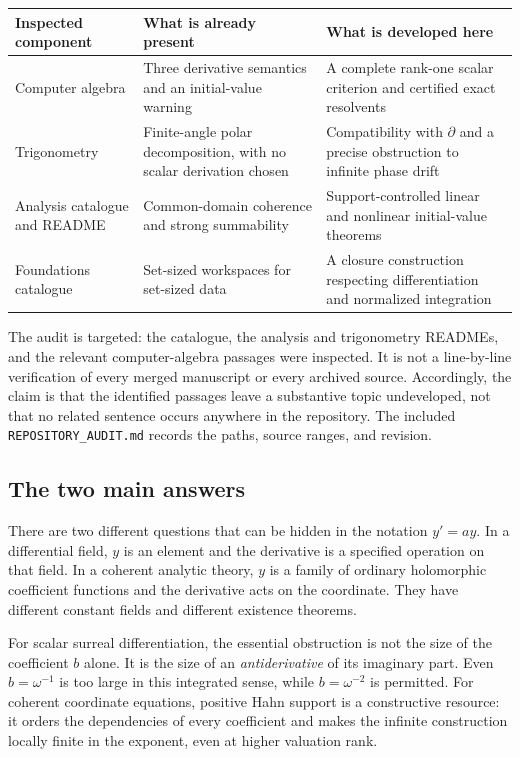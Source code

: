 \documentclass[11pt,letterpaper]{article}
\numberwithin{equation}{section}
\theoremstyle{definition}
\theoremstyle{remark}
\newcommand{\D}{\partial}
\begin{document}
\begin{center}\small
\begin{tabularx}{\textwidth}{@{}P{0.22\textwidth}YY@{}}
\toprule
Inspected component & What is already present & What is developed here\\
\midrule
Computer algebra & Three derivative semantics and an initial-value warning &
A complete rank-one scalar criterion and certified exact resolvents\\[0.5em]
Trigonometry & Finite-angle polar decomposition, with no scalar derivation chosen &
Compatibility with $\D$ and a precise obstruction to infinite phase drift\\[0.5em]
Analysis catalogue and README & Common-domain coherence and strong summability &
Support-controlled linear and nonlinear initial-value theorems\\[0.5em]
Foundations catalogue & Set-sized workspaces for set-sized data &
A closure construction respecting differentiation and normalized integration\\
\bottomrule
\end{tabularx}
\end{center}

The audit is targeted: the catalogue, the analysis and trigonometry READMEs,
and the relevant computer-algebra passages were inspected. It is not a
line-by-line verification of every merged manuscript or every archived
source. Accordingly, the claim is that the identified passages leave a
substantive topic undeveloped, not that no related sentence occurs anywhere
in the repository. The included \texttt{REPOSITORY\_AUDIT.md} records the
paths, source ranges, and revision.

\subsection{The two main answers}
There are two different questions that can be hidden in the notation
$y'=ay$. In a differential field, $y$ is an element and the derivative is a
specified operation on that field. In a coherent analytic theory, $y$ is a
family of ordinary holomorphic coefficient functions and the derivative
acts on the coordinate. They have different constant fields and different
existence theorems.

For scalar surreal differentiation, the essential obstruction is not the
size of the coefficient $b$ alone. It is the size of an \emph{antiderivative}
of its imaginary part. Even $b=\omega^{-1}$ is too large in this integrated
sense, while $b=\omega^{-2}$ is permitted. For coherent coordinate equations,
positive Hahn support is a constructive resource: it orders the dependencies
of every coefficient and makes the infinite construction locally finite in
the exponent, even at higher valuation rank.
\end{document}
